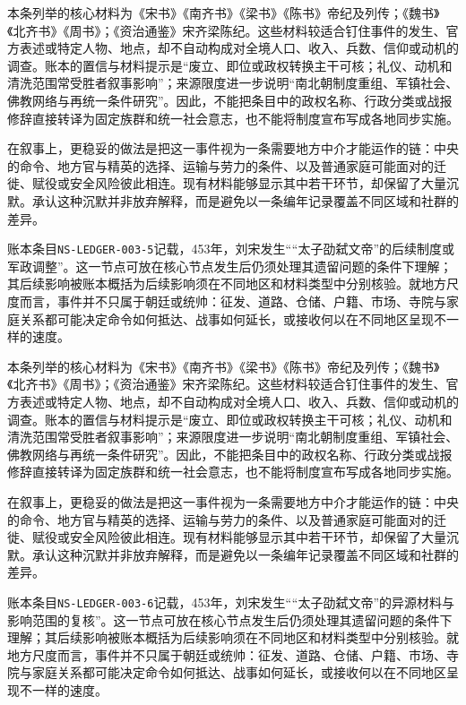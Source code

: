 本条列举的核心材料为《宋书》《南齐书》《梁书》《陈书》帝纪及列传；《魏书》《北齐书》《周书》；《资治通鉴》宋齐梁陈纪。这些材料较适合钉住事件的发生、官方表述或特定人物、地点，却不自动构成对全境人口、收入、兵数、信仰或动机的调查。账本的置信与材料提示是“废立、即位或政权转换主干可核；礼仪、动机和清洗范围常受胜者叙事影响”；来源限度进一步说明“南北朝制度重组、军镇社会、佛教网络与再统一条件研究”。因此，不能把条目中的政权名称、行政分类或战报修辞直接转译为固定族群和统一社会意志，也不能将制度宣布写成各地同步实施。

在叙事上，更稳妥的做法是把这一事件视为一条需要地方中介才能运作的链：中央的命令、地方官与精英的选择、运输与劳力的条件、以及普通家庭可能面对的迁徙、赋役或安全风险彼此相连。现有材料能够显示其中若干环节，却保留了大量沉默。承认这种沉默并非放弃解释，而是避免以一条编年记录覆盖不同区域和社群的差异。

账本条目\texttt{NS-LEDGER-003-5}记载，453年，刘宋发生““太子劭弑文帝”的后续制度或军政调整”。这一节点可放在核心节点发生后仍须处理其遗留问题的条件下理解；其后续影响被账本概括为后续影响须在不同地区和材料类型中分别核验。就地方尺度而言，事件并不只属于朝廷或统帅：征发、道路、仓储、户籍、市场、寺院与家庭关系都可能决定命令如何抵达、战事如何延长，或接收何以在不同地区呈现不一样的速度。

本条列举的核心材料为《宋书》《南齐书》《梁书》《陈书》帝纪及列传；《魏书》《北齐书》《周书》；《资治通鉴》宋齐梁陈纪。这些材料较适合钉住事件的发生、官方表述或特定人物、地点，却不自动构成对全境人口、收入、兵数、信仰或动机的调查。账本的置信与材料提示是“废立、即位或政权转换主干可核；礼仪、动机和清洗范围常受胜者叙事影响”；来源限度进一步说明“南北朝制度重组、军镇社会、佛教网络与再统一条件研究”。因此，不能把条目中的政权名称、行政分类或战报修辞直接转译为固定族群和统一社会意志，也不能将制度宣布写成各地同步实施。

在叙事上，更稳妥的做法是把这一事件视为一条需要地方中介才能运作的链：中央的命令、地方官与精英的选择、运输与劳力的条件、以及普通家庭可能面对的迁徙、赋役或安全风险彼此相连。现有材料能够显示其中若干环节，却保留了大量沉默。承认这种沉默并非放弃解释，而是避免以一条编年记录覆盖不同区域和社群的差异。

账本条目\texttt{NS-LEDGER-003-6}记载，453年，刘宋发生““太子劭弑文帝”的异源材料与影响范围的复核”。这一节点可放在核心节点发生后仍须处理其遗留问题的条件下理解；其后续影响被账本概括为后续影响须在不同地区和材料类型中分别核验。就地方尺度而言，事件并不只属于朝廷或统帅：征发、道路、仓储、户籍、市场、寺院与家庭关系都可能决定命令如何抵达、战事如何延长，或接收何以在不同地区呈现不一样的速度。

